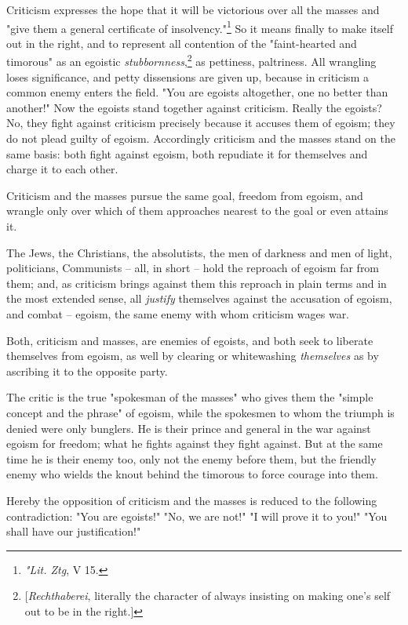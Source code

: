\documentclass[a4paper]{book}
\begin{document}
Criticism expresses the hope that it will be victorious over all the masses 
and "{}give them a general certificate of 
insolvency."{}\footnote{\textit{"{}Lit. Ztg}, V 15.} So it means finally to 
make itself out in the right, and to represent all contention of the 
"{}faint-hearted and timorous"{} as an egoistic 
\textit{stubbornness},\footnote{[\textit{Rechthaberei}, literally the 
character of always insisting on making one's self out to be in the right.]} 
as pettiness, paltriness. All wrangling loses significance, and petty 
dissensions are given up, because in criticism a common enemy enters the 
field. "{}You are egoists altogether, one no better than another!"{} Now the 
egoists stand together against criticism. Really the egoists? No, they fight 
against criticism precisely because it accuses them of egoism; they do not 
plead guilty of egoism. Accordingly criticism and the masses stand on the same 
basis: both fight against egoism, both repudiate it for themselves and charge 
it to each other.

Criticism and the masses pursue the same goal, freedom from egoism, and 
wrangle only over which of them approaches nearest to the goal or even attains 
it.

The Jews, the Christians, the absolutists, the men of darkness and men of 
light, politicians, Communists -- all, in short -- hold the reproach of egoism 
far from them; and, as criticism brings against them this reproach in plain 
terms and in the most extended sense, all \textit{justify} themselves against 
the accusation of egoism, and combat -- egoism, the same enemy with whom 
criticism wages war.

Both, criticism and masses, are enemies of egoists, and both seek to liberate 
themselves from egoism, as well by clearing or whitewashing 
\textit{themselves} as by ascribing it to the opposite party.

The critic is the true "{}spokesman of the masses"{} who gives them the 
"{}simple concept and the phrase"{} of egoism, while the spokesmen to whom the 
triumph is denied were only bunglers. He is their prince and general in the 
war against egoism for freedom; what he fights against they fight against. But 
at the same time he is their enemy too, only not the enemy before them, but 
the friendly enemy who wields the knout behind the timorous to force courage 
into them.

Hereby the opposition of criticism and the masses is reduced to the following 
contradiction: "{}You are egoists!"{} "{}No, we are not!"{} "{}I will prove it 
to you!"{} "{}You shall have our justification!"{}
\end{document}
